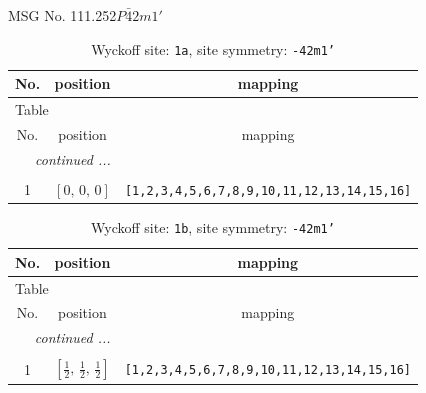 \documentclass[fleqn,8pt]{jsarticle}
\begin{document}
\setcounter{MaxMatrixCols}{32}

\renewcommand{\tablename}{Table~}
\renewcommand{\figurename}{Figure~}
\begin{center}
\LARGE
MSG No. 111.252\quad$P\bar{4}2m1'$
\end{center}
\renewcommand{\arraystretch}{1.2}
\begin{longtable}{ccc}
\caption{Wyckoff site: {\tt 1a}, site symmetry: {\tt -42m1'}}
 \\
 \hline \hline
No. & position & mapping \\ \hline \endfirsthead

\multicolumn{2}{l}{\tablename\ \thetable{}} \\
 \hline \hline
No. & position & mapping \\ \hline \endhead

 \hline \hline
\multicolumn{2}{r}{\footnotesize\it continued ...} \\ \endfoot

 \hline \hline
\multicolumn{2}{r}{} \\ \endlastfoot

1 & $\left[ 0,\, 0,\, 0 \right]$ & {\tt [1,2,3,4,5,6,7,8,9,10,11,12,13,14,15,16]} \\
\end{longtable}
\renewcommand{\arraystretch}{1.2}
\begin{longtable}{ccc}
\caption{Wyckoff site: {\tt 1b}, site symmetry: {\tt -42m1'}}
 \\
 \hline \hline
No. & position & mapping \\ \hline \endfirsthead

\multicolumn{2}{l}{\tablename\ \thetable{}} \\
 \hline \hline
No. & position & mapping \\ \hline \endhead

 \hline \hline
\multicolumn{2}{r}{\footnotesize\it continued ...} \\ \endfoot

 \hline \hline
\multicolumn{2}{r}{} \\ \endlastfoot

1 & $\left[ \frac{1}{2},\, \frac{1}{2},\, \frac{1}{2} \right]$ & {\tt [1,2,3,4,5,6,7,8,9,10,11,12,13,14,15,16]} \\
\end{longtable}
\renewcommand{\arraystretch}{1.2}
\end{document}
